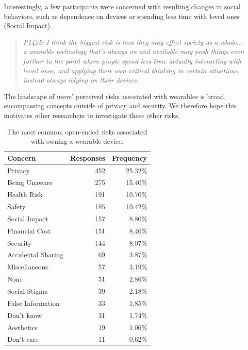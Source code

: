 \documentclass[conference]{IEEEtran}
\begin{document}
Interestingly, a few participants were concerned with resulting changes in social behaviors, such as dependence on devices or spending less time with loved ones (Social Impact). 

\begin{quotation}
\noindent
\textit{P1425: I think the biggest risk is how they may effect society as a whole... a wearable technology that's always on and available may push things even further to the point where people spend less time actually interacting with loved ones, and applying their own critical thinking in certain situations, instead always relying on their devices.}
\end{quotation}

The landscape of users' perceived risks associated with wearables is broad, encompassing concepts outside of privacy and security. We therefore hope this motivates other researchers to investigate these other risks. 

\begin{table}[t]
\begin{center}
\begin{tabular}{|l|r|r|}
\hline
Concern &  Responses &  Frequency   \\
\hline
Privacy & 452 & 25.32\% \\
Being Unaware & 275 & 15.40\% \\
Health Risk & 191 & 10.70\%\\
Safety & 185 & 10.42\%\\
Social Impact &	157 & 8.80\%\\
Financial Cost & 151 & 8.46\%\\
Security &	144 & 8.07\%\\
Accidental Sharing &	69 & 3.87\%\\
Miscellaneous &	57 & 3.19\%\\
None	& 51 & 2.86\%\\
Social Stigma &	39 & 2.18\%\\
False Information & 33 & 1.85\%\\
Don't know & 31 & 1.74\%\\
Aesthetics 	& 19 & 1.06\%\\
Don't care 	& 11 & 0.62\%\\
\hline
\end{tabular}
\caption{The most common open-ended risks associated with owning a wearable device.}
\label{openresponses}
\end{center}
\end{table}
\end{document}
